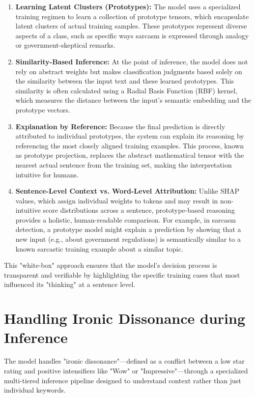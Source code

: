 \documentclass[11pt,oneside]{scrbook}
\begin{document}
\begin{enumerate}
    \item \textbf{Learning Latent Clusters (Prototypes):} The model uses a specialized training regimen to learn a collection of prototype tensors, which encapsulate latent clusters of actual training samples. These prototypes represent diverse aspects of a class, such as specific ways sarcasm is expressed through analogy or government-skeptical remarks.
    \item \textbf{Similarity-Based Inference:} At the point of inference, the model does not rely on abstract weights but makes classification judgments based solely on the similarity between the input text and these learned prototypes. This similarity is often calculated using a Radial Basis Function (RBF) kernel, which measures the distance between the input's semantic embedding and the prototype vectors.
    \item \textbf{Explanation by Reference:} Because the final prediction is directly attributed to individual prototypes, the system can explain its reasoning by referencing the most closely aligned training examples. This process, known as prototype projection, replaces the abstract mathematical tensor with the nearest actual sentence from the training set, making the interpretation intuitive for humans.
    \item \textbf{Sentence-Level Context vs. Word-Level Attribution:} Unlike SHAP values, which assign individual weights to tokens and may result in non-intuitive score distributions across a sentence, prototype-based reasoning provides a holistic, human-readable comparison. For example, in sarcasm detection, a prototype model might explain a prediction by showing that a new input (e.g., about government regulations) is semantically similar to a known sarcastic training example about a similar topic.
\end{enumerate}

This "white-box" approach ensures that the model's decision process is transparent and verifiable by highlighting the specific training cases that most influenced its "thinking" at a sentence level.

\section{Handling Ironic Dissonance during Inference}
The model handles "ironic dissonance"---defined as a conflict between a low star rating and positive intensifiers like "Wow" or "Impressive"---through a specialized multi-tiered inference pipeline designed to understand context rather than just individual keywords.
\end{document}
